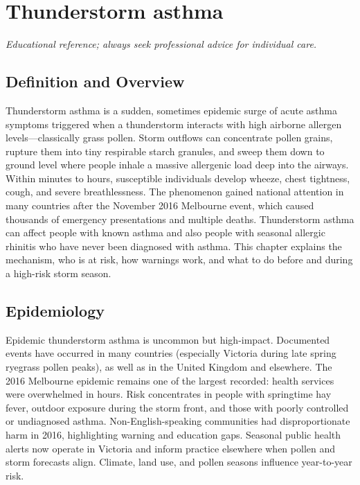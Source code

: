 \chapter{Thunderstorm asthma}

\medskip
\noindent\textit{Educational reference; always seek professional advice for individual care.}

\section*{Definition and Overview}
Thunderstorm asthma is a sudden, sometimes epidemic surge of acute asthma symptoms triggered when a thunderstorm interacts with high airborne allergen levels---classically grass pollen. Storm outflows can concentrate pollen grains, rupture them into tiny respirable starch granules, and sweep them down to ground level where people inhale a massive allergenic load deep into the airways. Within minutes to hours, susceptible individuals develop wheeze, chest tightness, cough, and severe breathlessness. The phenomenon gained national attention in many countries after the November 2016 Melbourne event, which caused thousands of emergency presentations and multiple deaths. Thunderstorm asthma can affect people with known asthma and also people with seasonal allergic rhinitis who have never been diagnosed with asthma. This chapter explains the mechanism, who is at risk, how warnings work, and what to do before and during a high-risk storm season.

\section*{Epidemiology}
Epidemic thunderstorm asthma is uncommon but high-impact. Documented events have occurred in many countries (especially Victoria during late spring ryegrass pollen peaks), as well as in the United Kingdom and elsewhere. The 2016 Melbourne epidemic remains one of the largest recorded: health services were overwhelmed in hours. Risk concentrates in people with springtime hay fever, outdoor exposure during the storm front, and those with poorly controlled or undiagnosed asthma. Non-English-speaking communities had disproportionate harm in 2016, highlighting warning and education gaps. Seasonal public health alerts now operate in Victoria and inform practice elsewhere when pollen and storm forecasts align. Climate, land use, and pollen seasons influence year-to-year risk.

